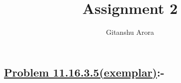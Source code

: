 \documentclass[journal,12pt,twocolumn]{IEEEtran}
\begin{document}
\newtheorem{theorem}{Theorem}[section]
\newtheorem{problem}{Problem}
\newtheorem{proposition}{Proposition}[section]
\newtheorem{lemma}{Lemma}[section]
\newtheorem{corollary}[theorem]{Corollary}
\newtheorem{example}{Example}[section]
\newtheorem{definition}[problem]{Definition}
\newcommand{\BEQA}{\begin{eqnarray}}
\newcommand{\EEQA}{\end{eqnarray}}
\newcommand{\define}{\stackrel{\triangle}{=}}



\providecommand{\mbf}{\mathbf}
\providecommand{\pr}[1]{\ensuremath{\Pr\left(#1\right)}}
\providecommand{\qfunc}[1]{\ensuremath{Q\left(#1\right)}}
\providecommand{\sbrak}[1]{\ensuremath{{}\left[#1\right]}}
\providecommand{\lsbrak}[1]{\ensuremath{{}\left[#1\right.}}
\providecommand{\rsbrak}[1]{\ensuremath{{}\left.#1\right]}}
\providecommand{\brak}[1]{\ensuremath{\left(#1\right)}}
\providecommand{\lbrak}[1]{\ensuremath{\left(#1\right.}}
\providecommand{\rbrak}[1]{\ensuremath{\left.#1\right)}}
\providecommand{\cbrak}[1]{\ensuremath{\left\{#1\right\}}}
\providecommand{\lcbrak}[1]{\ensuremath{\left\{#1\right.}}
\providecommand{\rcbrak}[1]{\ensuremath{\left.#1\right\}}}
\theoremstyle{remark}
\newtheorem{rem}{Remark}
\newcommand{\sgn}{\mathop{\mathrm{sgn}}}

\newcommand{\solution}{ \textbf{Solution: }}
\newcommand{\cosec}{\,\text{cosec}\,}
\providecommand{\dec}[2]{\ensuremath{\overset{#1}{\underset{#2}{\gtrless}}}}
\newcommand{\myvec}[1]{\ensuremath{\begin{pmatrix}#1\end{pmatrix}}}
\newcommand{\mydet}[1]{\ensuremath{\begin{vmatrix}#1\end{vmatrix}}}

\let\vec\mathbf


\vspace{3cm}

\title{
Assignment 2
}
\author{ Gitanshu Arora %
}
\maketitle
\newpage
\bigskip
\renewcommand{\thefigure}{\theenumi}
\renewcommand{\thetable}{\theenumi}

\subsection*{\textbf{\underline{Problem 11.16.3.5(exemplar)}:-}}
\end{document}
